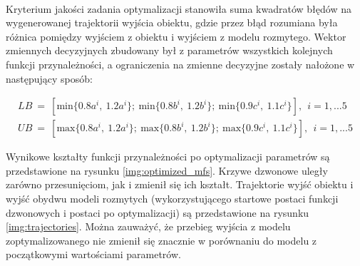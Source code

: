 \documentclass[a4paper,12pt]{article}
\begin{document}
\paragraph{}
Kryterium jakości zadania optymalizacji stanowiła suma kwadratów błędów na wygenerowanej trajektorii wyjścia obiektu, gdzie przez błąd rozumiana była różnica pomiędzy wyjściem z obiektu i wyjściem z modelu rozmytego.
Wektor zmiennych decyzyjnych zbudowany był z parametrów wszystkich kolejnych funkcji przynależności, a ograniczenia na zmienne decyzyjne zostały nałożone w następujący sposób:

\begin{equation}
   \begin{gathered}
      LB ~=~ \left[ \text{min} \lbrace0.8a^i,~1.2a^i\rbrace;~\text{min}\lbrace0.8b^i,~1.2b^i\rbrace;~\text{min}\lbrace0.9c^i,~1.1c^i\rbrace \right],~~i=1,...5\\[0.2cm]
      UB ~=~ \left[ \text{max} \lbrace0.8a^i,~1.2a^i\rbrace;~\text{max}\lbrace0.8b^i,~1.2b^i\rbrace;~\text{max}\lbrace0.9c^i,~1.1c^i\rbrace \right],~~i=1,...5
   \end{gathered}
\end{equation}

\newpage
\noindent Wynikowe kształty funkcji przynależności po optymalizacji parametrów są przedstawione na rysunku \ref{img:optimized_mfs}. Krzywe dzwonowe uległy zarówno przesunięciom, jak i zmienił się ich kształt. 
Trajektorie wyjść obiektu i wyjść obydwu modeli rozmytych (wykorzystującego startowe postaci funkcji dzwonowych i postaci po optymalizacji) są przedstawione na rysunku \ref{img:trajectories}.
Można zauważyć, że przebieg wyjścia z modelu zoptymalizowanego nie zmienił się znacznie w porównaniu do modelu z początkowymi wartościami parametrów.
\end{document}
